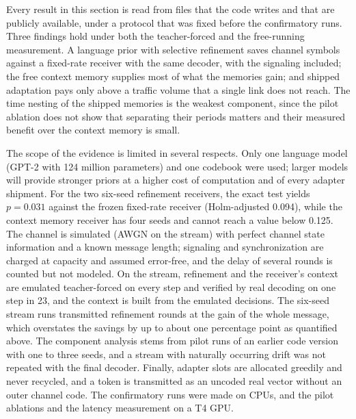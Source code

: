 Every result in this section is read from files that the code writes and that are publicly available, under a protocol that was fixed before the confirmatory runs. Three findings hold under both the teacher-forced and the free-running measurement. A language prior with selective refinement saves channel symbols against a fixed-rate receiver with the same decoder, with the signaling included; the free context memory supplies most of what the memories gain; and shipped adaptation pays only above a traffic volume that a single link does not reach. The time nesting of the shipped memories is the weakest component, since the pilot ablation does not show that separating their periods matters and their measured benefit over the context memory is small.

The scope of the evidence is limited in several respects. Only one language model (GPT-2 with 124 million parameters) and one codebook were used; larger models will provide stronger priors at a higher cost of computation and of every adapter shipment. For the two six-seed refinement receivers, the exact test yields $p = 0.031$ against the frozen fixed-rate receiver (Holm-adjusted 0.094), while the context memory receiver has four seeds and cannot reach a value below 0.125. The channel is simulated (AWGN on the stream) with perfect channel state information and a known message length; signaling and synchronization are charged at capacity and assumed error-free, and the delay of several rounds is counted but not modeled. On the stream, refinement and the receiver's context are emulated teacher-forced on every step and verified by real decoding on one step in 23, and the context is built from the emulated decisions. The six-seed stream runs transmitted refinement rounds at the gain of the whole message, which overstates the savings by up to about one percentage point as quantified above. The component analysis stems from pilot runs of an earlier code version with one to three seeds, and a stream with naturally occurring drift was not repeated with the final decoder. Finally, adapter slots are allocated greedily and never recycled, and a token is transmitted as an uncoded real vector without an outer channel code. The confirmatory runs were made on CPUs, and the pilot ablations and the latency measurement on a T4 GPU.
